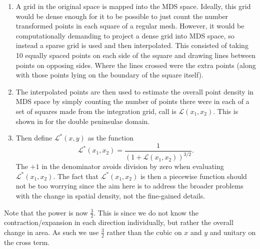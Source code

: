 \begin{enumerate}
\item A grid in the original space is mapped into the MDS space. Ideally, this grid would be dense enough for it to be possible to just count the number transformed points in each square of a regular mesh. However, it would be computationally demanding to project a dense grid into MDS space, so instead a sparse grid is used and then interpolated. This consisted of taking 10 equally spaced points on each side of the square and drawing lines between points on opposing sides. Where the lines crossed were the extra points (along with those points lying on the boundary of the square itself).
\item The interpolated points are then used to estimate the overall point density in MDS space by simply counting the number of points there were in each of a set of squares made from the integration grid, call is $\mathcal{L}(x_1,x_2)$. This is shown in  for the double peninsulae domain. 
\item Then define $\mathcal{L}^*(x,y)$ as the function
\begin{equation*}
\mathcal{L}^*(x_1,x_2)=\frac{1}{(1+\mathcal{L}(x_1,x_2))^{3/2}}.
\end{equation*}
The $+1$ in the denominator avoids division by zero when evaluating $\mathcal{L}^*(x_1,x_2)$. The fact that $\mathcal{L}^*(x_1,x_2)$ is then a piecewise function should not be too worrying since the aim here is to address the broader problems with the change in spatial density, not the fine-gained details.
\end{enumerate}

Note that the power is now $\frac{3}{2}$. This is since we do not know the contraction/expansion in each direction individually, but rather the overall change in area. As such we use $\frac{3}{2}$ rather than the cubic on $x$ and $y$ and unitary on the cross term.

